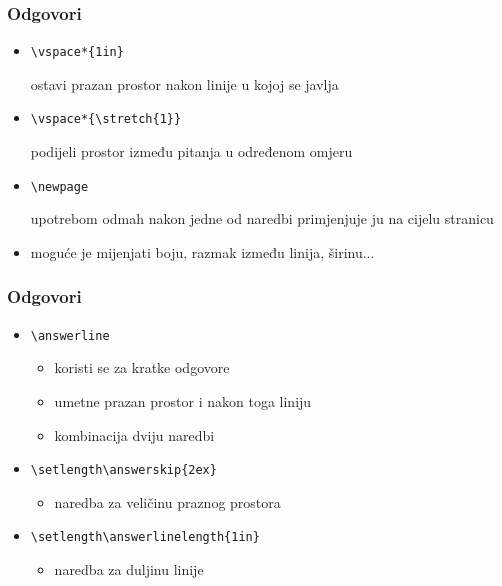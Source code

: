 \documentclass{beamer}
\begin{document}
    \begin{frame}[fragile]
    	\frametitle{Odgovori} 
    	\begin{itemize}
    		\item \begin{verbatim}\vspace*{1in}\end{verbatim} 
    		ostavi prazan prostor nakon linije u kojoj se javlja
    		\item \begin{verbatim}\vspace*{\stretch{1}}\end{verbatim} 
    		podijeli prostor između pitanja u određenom omjeru
    		\item \begin{verbatim}\newpage\end{verbatim} 
    		upotrebom odmah nakon jedne od naredbi primjenjuje ju na cijelu stranicu
    		\item moguće je mijenjati boju, razmak između linija, širinu...
    	\end{itemize}	
    \end{frame}
    
    \begin{frame}[fragile] 
    	\frametitle{Odgovori}
    	\begin{itemize}
    		\item \begin{verbatim}\answerline\end{verbatim}
    			\begin{itemize}
    				\item koristi se za kratke odgovore
    				\item umetne prazan prostor i nakon toga liniju
    				\item kombinacija dviju naredbi
    			\end{itemize}
    		\item \begin{verbatim}\setlength\answerskip{2ex}\end{verbatim}
    			\begin{itemize}
    				\item naredba za veličinu praznog prostora
    			\end{itemize}
    		\item \begin{verbatim}\setlength\answerlinelength{1in}\end{verbatim}
    			\begin{itemize}
    				\item naredba za duljinu linije 
    			\end{itemize}
    	\end{itemize}
    \end{frame}
\end{document}
